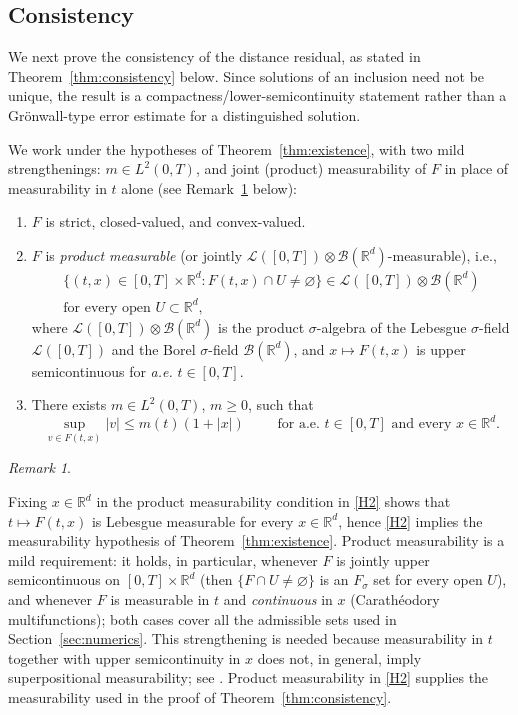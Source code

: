 \documentclass[11pt]{elsarticle}
\theoremstyle{definition}
\theoremstyle{remark}
\newtheorem{remark}[theorem]{Remark}
\numberwithin{equation}{section}
\begin{document}
	\subsection{Consistency}
	\label{subsec:consistency}
	
	We next prove the consistency of the distance residual, as stated in Theorem~\ref{thm:consistency} below. Since solutions of an inclusion need not be unique,
	the result is a compactness/lower-semicontinuity statement rather than a
	Gr\"onwall-type error estimate for a distinguished solution.
	
	We work under the hypotheses of Theorem~\ref{thm:existence}, with two
	mild strengthenings: $m\in L^2(0,T)$, and joint (product)
	measurability of $F$ in place of measurability in $t$ alone
	(see Remark~\ref{rem:H2-product} below):
	
	\begin{enumerate}[label=(H\arabic*)]
		\item \label{H1} $F$ is strict, closed-valued, and convex-valued.
		\item \label{H2} $F$ is \emph{product measurable} (or jointly $\mathscr{L}([0,T])\otimes\mathcal{B}(\mathbb{R}^d)$-measurable), i.e.,
		\[
		\begin{gathered}
		\bigl\{(t,x)\in[0,T]\times\mathbb{R}^d:F(t,x)\cap
		U\neq\varnothing\bigr\}
		\in
		\mathscr{L}([0,T])\otimes\mathcal{B}(\mathbb{R}^d) \\
		\text{for every open }U\subset\mathbb{R}^d,
		\end{gathered}
		\]
		where $\mathscr{L}([0,T])\otimes\mathcal{B}(\mathbb{R}^d)$ is the product $\sigma$-algebra of the Lebesgue $\sigma$-field $\mathscr{L}(
[0,T])$ and the Borel $\sigma$-field $\mathcal{B}(\mathbb{R}^d)$, and $x\mapsto F(t,x)$ is upper
		semicontinuous for \emph{a.e.} $t\in[0,T]$.
		\item \label{H3} There exists $m\in L^2(0,T)$, $m\ge0$, such that
		\[
		\sup_{v\in F(t,x)}|v|\le m(t)(1+|x|) \qquad  
		\text{ for a.e. } t\in[0,T] \text{ and every } x\in\mathbb{R}^d.
		\]
	\end{enumerate}
	
	\begin{remark}\label{rem:H2-product}
	
		Fixing $x\in\mathbb{R}^d$ in the product measurability condition in \ref{H2} shows that $t\mapsto F(t,x)$ is Lebesgue measurable for every $x\in\mathbb{R}^d$, hence \ref{H2} implies the
		measurability hypothesis of Theorem~\ref{thm:existence}. Product
		measurability is a mild requirement: it holds, in particular,
		whenever $F$ is jointly upper semicontinuous on
		$[0,T]\times\mathbb{R}^d$ (then $\{F\cap U\neq\varnothing\}$ is an
		$F_\sigma$ set for every open $U$), and whenever $F$ is measurable in
		$t$ and \emph{continuous} in $x$ (Carath\'eodory multifunctions);
		both cases cover all the admissible sets used in
		Section~\ref{sec:numerics}. This strengthening is needed because
		measurability in $t$ together with upper semicontinuity in $x$ does not,
		in general, imply superpositional measurability; see
		\cite{zygmunt_1992}. Product measurability in \ref{H2} supplies the
		measurability used in the proof of Theorem~\ref{thm:consistency}.
	\end{remark}
	
\end{document}
